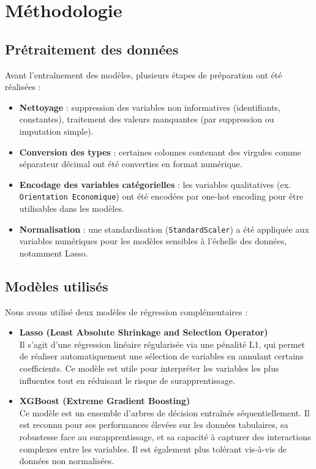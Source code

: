 \section{Méthodologie}

\subsection*{Prétraitement des données}

Avant l'entraînement des modèles, plusieurs étapes de préparation ont été réalisées :

\begin{itemize}
  \item \textbf{Nettoyage} : suppression des variables non informatives (identifiants, constantes), traitement des valeurs manquantes (par suppression ou imputation simple).
  \item \textbf{Conversion des types} : certaines colonnes contenant des virgules comme séparateur décimal ont été converties en format numérique.
  \item \textbf{Encodage des variables catégorielles} : les variables qualitatives (ex. \texttt{Orientation Economique}) ont été encodées par one-hot encoding pour être utilisables dans les modèles.
  \item \textbf{Normalisation} : une standardisation (\texttt{StandardScaler}) a été appliquée aux variables numériques pour les modèles sensibles à l’échelle des données, notamment Lasso.
\end{itemize}

\subsection*{Modèles utilisés}

Nous avons utilisé deux modèles de régression complémentaires :

\begin{itemize}
  \item \textbf{Lasso (Least Absolute Shrinkage and Selection Operator)} \\
  Il s'agit d'une régression linéaire régularisée via une pénalité L1, qui permet de réaliser automatiquement une sélection de variables en annulant certains coefficients. Ce modèle est utile pour interpréter les variables les plus influentes tout en réduisant le risque de surapprentissage.

  \item \textbf{XGBoost (Extreme Gradient Boosting)} \\
  Ce modèle est un ensemble d’arbres de décision entraînés séquentiellement. Il est reconnu pour ses performances élevées sur les données tabulaires, sa robustesse face au surapprentissage, et sa capacité à capturer des interactions complexes entre les variables. Il est également plus tolérant vis-à-vis de données non normalisées.
\end{itemize}

